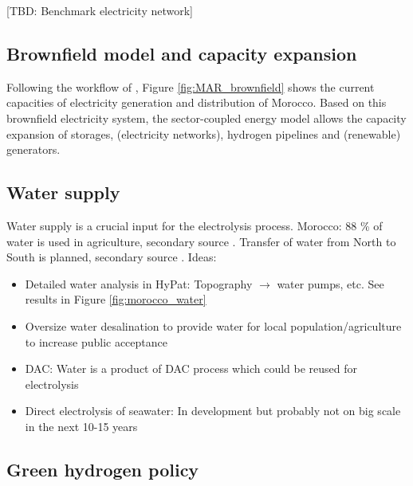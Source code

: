 [TBD: Benchmark electricity network]


\subsection{Brownfield model and capacity expansion}
Following the workflow of \cite{Parzen2023}, Figure \ref{fig:MAR_brownfield} shows the current capacities of electricity generation and distribution of Morocco. Based on this brownfield electricity system, the sector-coupled energy model allows the capacity expansion of storages, (electricity networks), hydrogen pipelines and (renewable) generators.








\subsection{Water supply}
\label{subsec:water_supply}
Water supply is a crucial input for the electrolysis process. 
Morocco: 88 \% of water is used in agriculture, secondary source \cite{Ersoy2022}.
Transfer of water from North to South is planned, secondary source \cite{Ersoy2022}.
Ideas:
\begin{itemize}
    \item Detailed water analysis in HyPat: Topography $\rightarrow$ water pumps, etc. See results in Figure \ref{fig:morocco_water}
    \item Oversize water desalination to provide water for local population/agriculture to increase public acceptance
    \item DAC: Water is a product of DAC process which could be reused for electrolysis
    \item Direct electrolysis of seawater: In development but probably not on big scale in the next 10-15 years
\end{itemize}


\subsection{Green hydrogen policy}
\label{subsubsec:green_hydrogen_constraint}

